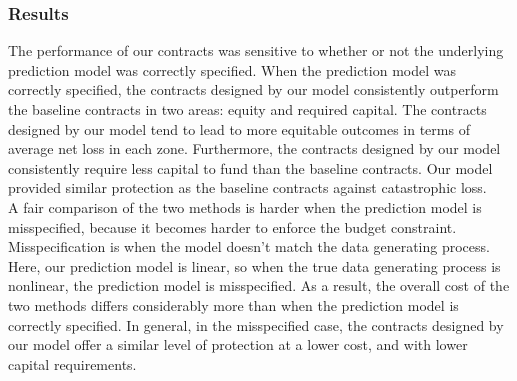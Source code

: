 \documentclass[11pt]{article}
\newcounter{subsubsubsection}[subsubsection]
\begin{document}
    \subsubsection{Results}
      The performance of our contracts was sensitive to whether or not the underlying prediction model was correctly specified. When the prediction model was correctly specified, the contracts designed by our model consistently outperform the baseline contracts in two areas: equity and required capital. The contracts designed by our model tend to lead to more equitable outcomes in terms of average net loss in each zone. Furthermore, the contracts designed by our model consistently require less capital to fund than the baseline contracts. Our model provided similar protection as the baseline contracts against catastrophic loss. \\
      A fair comparison of the two methods is harder when the prediction model is misspecified, because it becomes harder to enforce the budget constraint. Misspecification is when the model doesn't match the data generating process. Here, our prediction model is linear, so when the true data generating process is nonlinear, the prediction model is misspecified. As a result, the overall cost of the two methods differs considerably more than when the prediction model is correctly specified. In general, in the misspecified case, the contracts designed by our model offer a similar level of protection at a lower cost, and with lower capital requirements.  

\end{document}
